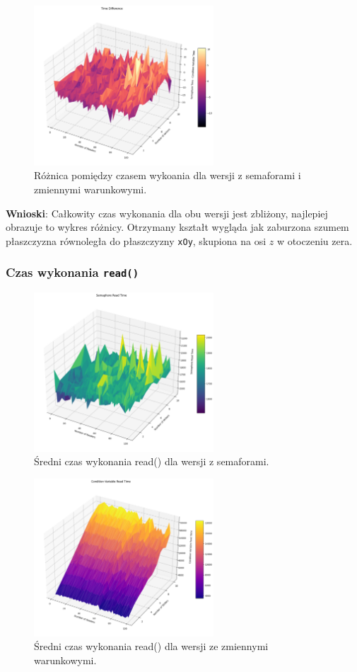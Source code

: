 \documentclass[11pt]{article}
\begin{document}
\begin{figure}[H]
\centering
\includegraphics[width=0.6\textwidth]{./semcondT.png}
\caption{Różnica pomiędzy czasem wykoania dla wersji z semaforami i zmiennymi warunkowymi.}
\end{figure}


\textbf{Wnioski}: Całkowity czas wykonania dla obu wersji jest zbliżony, najlepiej
obrazuje to wykres różnicy. Otrzymany kształt wygląda jak zaburzona szumem
płaszczyzna równoległa do płaszczyzny \texttt{xOy}, skupiona na osi \(z\) w otoczeniu zera.
\subsubsection*{Czas wykonania \texttt{read()}}
\label{sec:org8be9021}
\begin{figure}[H]
\centering
\includegraphics[width=0.6\textwidth]{./semR.png}
\caption{Średni czas wykonania read() dla wersji z semaforami.}
\end{figure}

\begin{figure}[H]
\centering
\includegraphics[width=0.6\textwidth]{./condR.png}
\caption{Średni czas wykonania read() dla wersji ze zmiennymi warunkowymi.}
\end{figure}
\end{document}
